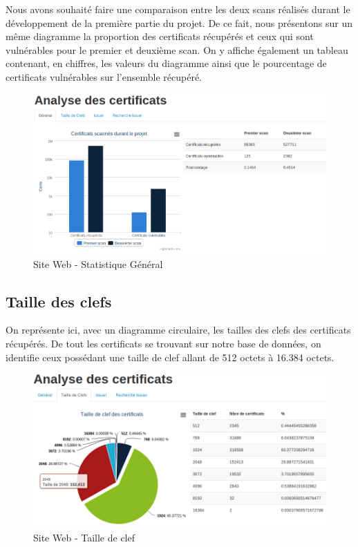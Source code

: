 Nous avons souhaité faire une comparaison entre les deux scans réalisés durant le développement de la première partie du projet. De ce fait, nous présentons sur un même diagramme la proportion des certificats récupérés et ceux qui sont vulnérables pour le premier et deuxième scan. On y affiche également un tableau contenant, en chiffres, les valeurs du diagramme ainsi que le pourcentage de certificats vulnérables sur l'ensemble récupéré.

\begin{figure}[H]
\begin{center}
\includegraphics[scale=0.5]{images/site_web_stats_gen.png}
\end{center}
\caption{Site Web - Statistique Général}
\label{stats_general}
\end{figure}

\subsection{Taille des clefs}

On représente ici, avec un diagramme circulaire, les tailles des clefs des certificats récupérés. De tout les certificats se trouvant sur notre base de données, on identifie ceux possédant une taille de clef allant de 512 octets à 16.384 octets.

\begin{figure}[H]
\begin{center}
\includegraphics[scale=0.5]{images/site_web_stats_clefs.png}
\end{center}
\caption{Site Web - Taille de clef}
\label{taille_clefs}
\end{figure}


